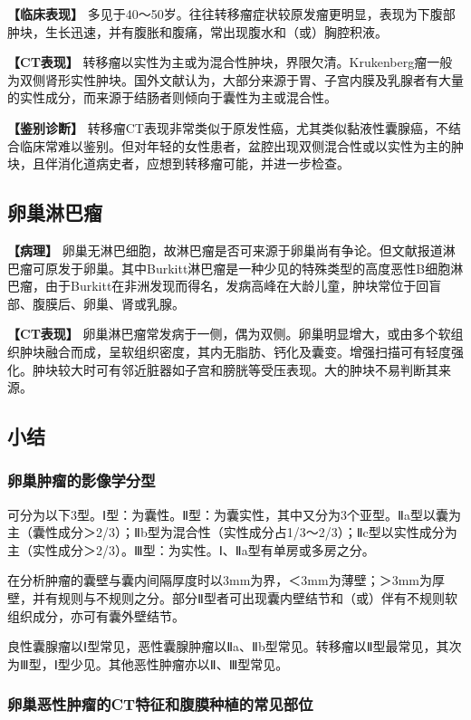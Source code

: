 \textbf{【临床表现】}
多见于40～50岁。往往转移瘤症状较原发瘤更明显，表现为下腹部肿块，生长迅速，并有腹胀和腹痛，常出现腹水和（或）胸腔积液。

\textbf{【CT表现】}
转移瘤以实性为主或为混合性肿块，界限欠清。Krukenberg瘤一般为双侧肾形实性肿块。国外文献认为，大部分来源于胃、子宫内膜及乳腺者有大量的实性成分，而来源于结肠者则倾向于囊性为主或混合性。

\textbf{【鉴别诊断】}
转移瘤CT表现非常类似于原发性癌，尤其类似黏液性囊腺癌，不结合临床常难以鉴别。但对年轻的女性患者，盆腔出现双侧混合性或以实性为主的肿块，且伴消化道病史者，应想到转移瘤可能，并进一步检查。

\subsection{卵巢淋巴瘤}

\textbf{【病理】}
卵巢无淋巴细胞，故淋巴瘤是否可来源于卵巢尚有争论。但文献报道淋巴瘤可原发于卵巢。其中Burkitt淋巴瘤是一种少见的特殊类型的高度恶性B细胞淋巴瘤，由于Burkitt在非洲发现而得名，发病高峰在大龄儿童，肿块常位于回盲部、腹膜后、卵巢、肾或乳腺。

\textbf{【CT表现】}
卵巢淋巴瘤常发病于一侧，偶为双侧。卵巢明显增大，或由多个软组织肿块融合而成，呈软组织密度，其内无脂肪、钙化及囊变。增强扫描可有轻度强化。肿块较大时可有邻近脏器如子宫和膀胱等受压表现。大的肿块不易判断其来源。

\subsection{小结}

\subsubsection{卵巢肿瘤的影像学分型}

可分为以下3型。Ⅰ型：为囊性。Ⅱ型：为囊实性，其中又分为3个亚型。Ⅱa型以囊为主（囊性成分＞2/3）；Ⅱb型为混合性（实性成分占1/3～2/3）；Ⅱc型以实性成分为主（实性成分＞2/3）。Ⅲ型：为实性。Ⅰ、Ⅱa型有单房或多房之分。

在分析肿瘤的囊壁与囊内间隔厚度时以3mm为界，＜3mm为薄壁；＞3mm为厚壁，并有规则与不规则之分。部分Ⅱ型者可出现囊内壁结节和（或）伴有不规则软组织成分，亦可有囊外壁结节。

良性囊腺瘤以Ⅰ型常见，恶性囊腺肿瘤以Ⅱa、Ⅱb型常见。转移瘤以Ⅱ型最常见，其次为Ⅲ型，Ⅰ型少见。其他恶性肿瘤亦以Ⅱ、Ⅲ型常见。

\subsubsection{卵巢恶性肿瘤的CT特征和腹膜种植的常见部位}

